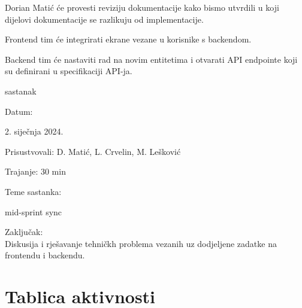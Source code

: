 \begin{packed_enum}
\begin{packed_item}
Dorian Matić će provesti reviziju dokumentacije kako bismo utvrdili u koji dijelovi dokumentacije se razlikuju od
implementacije.

Frontend tim će integrirati ekrane vezane u korisnike s backendom.

Backend tim će nastaviti rad na novim entitetima i otvarati API endpointe koji su definirani u specifikaciji API-ja.
                
			
			\end{packed_item}

			\item  sastanak
			\item[] \begin{packed_item}
				\item Datum: \date[{2. siječnja 2024.}
				\item Prisustvovali: D. Matić, L. Crvelin, M. Lešković
				\item Trajanje: 30 min
				\item Teme sastanka: 
				\begin{packed_item}
					\item  mid-sprint sync
				\end{packed_item}
                \item Zaključak: \\
                Diskusija i rješavanje tehničkh problema vezanih uz dodjeljene zadatke na frontendu i backendu.
                
			
			\end{packed_item}

		\end{packed_enum}
		
		\eject
		\section*{Tablica aktivnosti}

